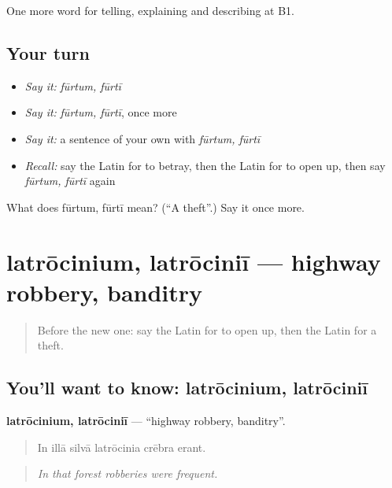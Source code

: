 \begin{grammarlens}[title={What you've built}]
One more word for telling, explaining and describing at B1.
\end{grammarlens}

\subsection*{Your turn}
\begin{itemize}
\raggedright
  \item \emph{Say it:} \emph{fūrtum, fūrtī}
  \item \emph{Say it:} \emph{fūrtum, fūrtī}, once more
  \item \emph{Say it:} a sentence of your own with \emph{fūrtum, fūrtī}
  \item \emph{Recall:} say the Latin for to betray, then the Latin for to open up, then say \emph{fūrtum, fūrtī} again
\end{itemize}

\begin{tcolorbox}[breakable,colback=teal!4,colframe=teal!35!black,title={Before you move on}]
What does fūrtum, fūrtī mean? (\textquotedblleft{}A theft\textquotedblright{}.) Say it once more.
\end{tcolorbox}
\section[latrōcinium, latrōciniī]{latrōcinium, latrōciniī — highway robbery, banditry}

\label{lesson:LA-C303-latrocinium}



\begin{quote}
Before the new one: say the Latin for to open up, then the Latin for a theft.
\end{quote}

\subsection*{You'll want to know: latrōcinium, latrōciniī}
\textbf{latrōcinium, latrōciniī} — \textquotedblleft{}highway robbery, banditry\textquotedblright{}.

\begin{quote}
In illā silvā latrōcinia crēbra erant.
\end{quote}

\begin{quote}
\emph{In that forest robberies were frequent.}
\end{quote}

